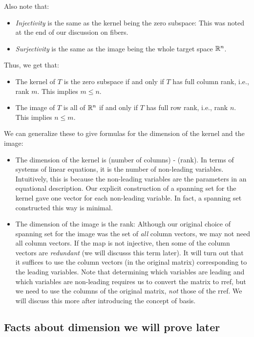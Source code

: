 \documentclass[10pt]{amsart}
\begin{document}
Also note that:

\begin{itemize}
\item {\em Injectivity} is the same as the kernel being the zero
  subspace: This was noted at the end of our discussion on fibers.
\item {\em Surjectivity} is the same as the image being the whole
  target space $\mathbb{R}^n$.
\end{itemize}

Thus, we get that:

\begin{itemize}
\item The kernel of $T$ is the zero subspace if and only if $T$ has
  full column rank, i.e., rank $m$. This implies $m \le n$.
\item The image of $T$ is all of $\mathbb{R}^n$ if and only if $T$ has full
  row rank, i.e., rank $n$. This implies $n \le m$.
\end{itemize}

We can generalize these to give formulas for the dimension of the
kernel and the image:

\begin{itemize}
\item The dimension of the kernel is (number of columns) - (rank). In
  terms of systems of linear equations, it is the number of
  non-leading variables. Intuitively, this is because the non-leading
  variables are the parameters in an equational description. Our
  explicit construction of a spanning set for the kernel gave one
  vector for each non-leading variable. In fact, a spanning set
  constructed this way is minimal.
\item The dimension of the image is the rank: Although our original
  choice of spanning set for the image was the set of {\em all} column
  vectors, we may not need all column vectors. If the map is not
  injective, then some of the column vectors are {\em redundant} (we
  will discusss this term later). It will turn out that it suffices to
  use the column vectors (in the original matrix) corresponding to the
  leading variables. Note that determining which variables are leading
  and which variables are non-leading requires us to convert the
  matrix to rref, but we need to use the columns of the original
  matrix, {\em not} those of the rref. We will discuss this more after
  introducing the concept of basis.
\end{itemize}

\subsection{Facts about dimension we will prove later}
\end{document}
